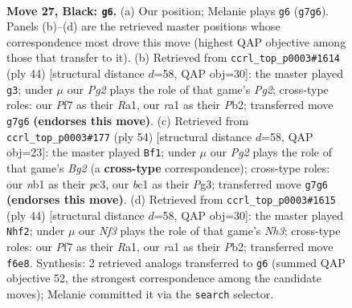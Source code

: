 \documentclass[11pt]{article}
\begin{document}
\clearpage

\begin{figure}[p]\centering
\begin{subfigure}{0.46\textwidth}\centering
\resizebox{\linewidth}{!}{%
\newchessgame
\chessboard[
  setfen={1r4k1/2p2ppp/p1P2n2/4pn1b/B7/P7/6P1/RNB3K1 b - - 0 27},
  showmover=false,
  pgfstyle=straightmove, color=movearrow, markmove={g7-g6}
]}
\caption{}
\end{subfigure}\hfill
\begin{subfigure}{0.46\textwidth}\centering
\resizebox{\linewidth}{!}{%
\newchessgame
\chessboard[
  setfen={1nbr2k1/8/p3p2p/1p2b3/4N3/2P4N/PP4PP/R4BK1 w - - 2 23},
  showmover=false,
  pgfstyle=straightmove, color=movearrow, markmove={g2-g3}
]}
\caption{}
\end{subfigure}
\\[4pt]
\begin{subfigure}{0.46\textwidth}\centering
\resizebox{\linewidth}{!}{%
\newchessgame
\chessboard[
  setfen={r5k1/3n1ppp/4p3/8/Pb1PP3/2p2NP1/5PBP/2R3K1 w - - 2 28},
  showmover=false,
  pgfstyle=straightmove, color=movearrow, markmove={g2-f1}
]}
\caption{}
\end{subfigure}\hfill
\begin{subfigure}{0.46\textwidth}\centering
\resizebox{\linewidth}{!}{%
\newchessgame
\chessboard[
  setfen={1nbr2k1/8/p3p2p/1p2b3/4N3/2P4N/PP4PP/R4BK1 w - - 2 23},
  showmover=false,
  pgfstyle=straightmove, color=movearrow, markmove={h3-f2}
]}
\caption{}
\end{subfigure}
\caption{\textbf{Move 27, Black: \texttt{g6}.} (a) Our position; Melanie plays \texttt{g6} (\texttt{g7g6}). Panels (b)--(d) are the retrieved master positions whose correspondence most drove this move (highest QAP objective among those that transfer to it). (b) Retrieved from \texttt{ccrl\_top\_p0003\#1614} (ply 44) [structural distance $d$=58, QAP obj=30]: the master played \texttt{g3}; under $\mu$ our \emph{Pg2} plays the role of that game's \emph{Pg2}; cross-type roles: our \emph{P}f7 as their \emph{R}a1, our \emph{r}a1 as their \emph{P}b2; transferred move \texttt{g7g6} \textbf{(endorses this move)}. (c) Retrieved from \texttt{ccrl\_top\_p0003\#177} (ply 54) [structural distance $d$=58, QAP obj=23]: the master played \texttt{Bf1}; under $\mu$ our \emph{Pg2} plays the role of that game's \emph{Bg2} (a \textbf{cross-type} correspondence); cross-type roles: our \emph{n}b1 as their \emph{p}c3, our \emph{b}c1 as their \emph{P}g3; transferred move \texttt{g7g6} \textbf{(endorses this move)}. (d) Retrieved from \texttt{ccrl\_top\_p0003\#1615} (ply 44) [structural distance $d$=58, QAP obj=30]: the master played \texttt{Nhf2}; under $\mu$ our \emph{Nf3} plays the role of that game's \emph{Nh3}; cross-type roles: our \emph{P}f7 as their \emph{R}a1, our \emph{r}a1 as their \emph{P}b2; transferred move \texttt{f6e8}. Synthesis: 2 retrieved analogs transferred to \texttt{g6} (summed QAP objective 52, the strongest correspondence among the candidate moves); Melanie committed it via the \texttt{search} selector.}
\label{fig:thought-m53}
\end{figure}
\end{document}
